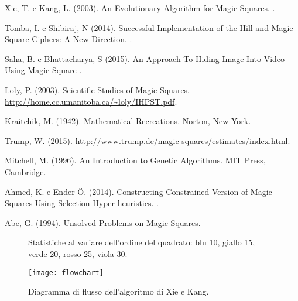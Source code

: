 \documentclass[italian,twoside,twocolumn]{article}
\begin{document}
\begin{thebibliography}{99} %

Xie, T. e Kang, L. (2003).
\newblock An Evolutionary Algorithm for Magic Squares.
.

Tomba, I. e Shibiraj, N (2014).
\newblock Successful Implementation of the Hill and Magic Square Ciphers: A New Direction.
.

Saha, B. e Bhattacharya, S (2015).
\newblock An Approach To Hiding Image Into Video  Using Magic Square
.

Loly, P. (2003).
\newblock Scientific Studies of Magic Squares.
\newblock \url{http://home.cc.umanitoba.ca/~loly/IHPST.pdf}.

Kraitchik, M. (1942).
\newblock Mathematical Recreations.
\newblock Norton, New York.

Trump, W. (2015).
\newblock \url{http://www.trump.de/magic-squares/estimates/index.html}.

Mitchell, M. (1996).
\newblock An Introduction to Genetic Algorithms.
\newblock MIT Press, Cambridge.

Ahmed, K. e Ender Ö. (2014).
\newblock Constructing Constrained-Version of Magic Squares Using Selection Hyper-heuristics.
.

Abe, G. (1994).
\newblock Unsolved Problems on Magic Squares.
 
\end{thebibliography}



\onecolumn

\begin{figure}[htbp]
	\centering
	
	\centering
	\caption{Statistiche al variare dell'ordine del quadrato: blu 10, giallo 15, verde 20, rosso 25, viola 30.}
\end{figure}

\begin{figure}[htbp]
	\centering
	\texttt{[image: flowchart]}
	\caption{Diagramma di flusso dell'algoritmo di Xie e Kang.}
	\label{fig:flowchart}
\end{figure}
\end{document}
